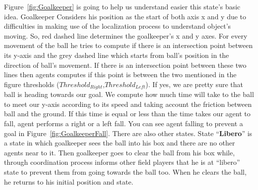 Figure~\ref{fig:Goalkeeper} is going to help us understand easier this state's basic idea. Goalkeeper Considers his position as the start of both axis x and y due to difficulties in making use of the localization process to understand object's moving. So, red dashed line determines the goalkeeper's x and y axes. For every movement of the ball he tries to compute if there is an intersection point between its y-axis and the grey dashed line which starts from ball's position in the direction of ball's movement. If there is an intersection point between these two lines then agents computes if this point is between the two mentioned in the figure thresholds ($Threshold_{Right}$,$Threshold_{Left}$). If yes, we are pretty sure that ball is heading towards our goal. We compute how much time will take to the ball to meet our y-axis according to its speed and taking account the friction between ball and the ground. If this time is equal or less than the time takes our agent to fall, agent performs a right or a left fall. You can see agent falling to prevent a goal in Figure~\ref{fig:GoalkeeperFall}. There are also other states. State ``\textbf{Libero}'' is a state in which goalkeeper sees the ball into his box and there are no other agents near to it. Then goalkeeper goes to clear the ball from his box while, through coordination process informs other field players that he is at ``libero'' state to prevent them from going towards the ball too. When he clears the ball, he returns to his initial position and state. 

